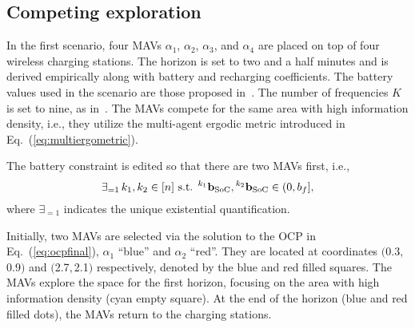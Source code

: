 \documentclass[letterpaper,10pt,conference,twoside]{IEEEtran}
\theoremstyle{definition}
\begin{document}
\subsection*{Competing exploration}
\noindent
In the first scenario, four MAVs $\alpha_1$, $\alpha_2$, $\alpha_3$, and $\alpha_4$ are placed on top of four wireless charging stations. The horizon is set to two and a half minutes and is derived empirically along with battery and recharging coefficients. The battery values used in the scenario are those proposed in~\cite{zhao2017observability}. The number of frequencies $K$ is set to nine, as in~\cite{calinon2020mixture}. %
The MAVs compete for the same area with high information density, i.e., they utilize the multi-agent ergodic metric introduced in Eq.~(\ref{eq:multiergometric}).

The battery constraint is edited so that there are two MAVs first, i.e.,\vspace*{-.1cm}
\begin{equation}
\exists_{=1}\, k_1,k_2\in[n]\text{ s.t. }{}^{k_1} \mathbf{b}_{\text{SoC}},{}^{k_2} \mathbf{b}_{\text{SoC}}\in(0,b_f],\vspace*{-.1cm}
\end{equation} 
where %
$\exists_{=1}$ indicates the unique existential quantification.

Initially, two MAVs are selected via the solution to the OCP in Eq.~(\ref{eq:ocpfinal}), $\alpha_1$ ``blue'' and $\alpha_2$ ``red''. They are located at coordinates $($0.3$,$0.9$)$ and $($2.7$,$2.1$)$ respectively, denoted by the blue and red filled squares. The MAVs explore the space for the first horizon, focusing on the area with high information density (cyan empty square). At the end of the horizon (blue and red filled dots), the MAVs return to the charging stations. %
\end{document}
